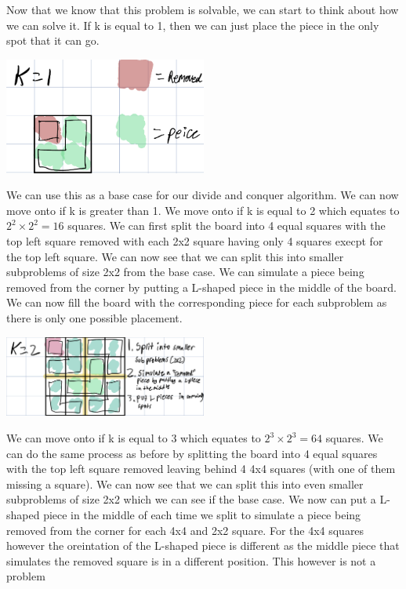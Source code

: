 \documentclass[12pt,letterpaper]{article}
\begin{document}
Now that we know that this problem is solvable, we can start to think about
how we can solve it. If k is equal to 1, then we can just place the piece
in the only spot that it can go. 
\begin{center}
    \includegraphics[width=0.5\textwidth]{images/1.1.jpeg}
\end{center}
We can use this as a base case for our
divide and conquer algorithm. We can now move onto if k is greater than 1.
We move onto if k is equal to 2 which equates to $2^2\times2^2=16$ squares. We can first split the board into 4 equal
squares with the top left square removed with each 2x2 square having only 
4 squares execpt for the top left square. We can now see that we can split this 
into smaller subproblems of size 2x2 from the base case. We can simulate a piece
being removed from the corner by putting a L-shaped piece in the middle of the 
board. We can now fill the board with the corresponding piece for each subproblem
as there is only one possible placement. 
\begin{center}
    \includegraphics[width=0.5\textwidth]{images/1.2.jpeg}
\end{center}
We can move onto if k is equal to 3 which equates to $2^3\times2^3=64$ squares. We can do the same
process as before by splitting the board into 4 equal squares with the top left square removed leaving
behind 4 4x4 squares (with one of them missing a square).
We can now see that we can split this into even smaller subproblems of size 2x2 which
we can see if the base case. We now can put a L-shaped piece in the middle of each time
we split to simulate a piece being removed from the corner for each 4x4 and 2x2 square.
For the 4x4 squares however the oreintation of the L-shaped piece is different as the middle 
piece that simulates the removed square is in a different position. This however is not a problem
\end{document}
